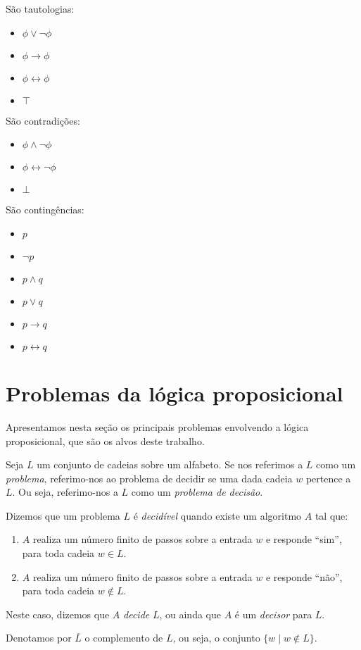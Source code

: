 \begin{example}
    São tautologias:
    \begin{itemize}
        \item $\phi \vee \neg \phi$
        \item $\phi \rightarrow \phi$
        \item $\phi \leftrightarrow \phi$
        \item $\top$
    \end{itemize}
    São contradições:
    \begin{itemize}
        \item $\phi \wedge \neg \phi$
        \item $\phi \leftrightarrow \neg \phi$
        \item $\bot$
    \end{itemize}
    São contingências:
    \begin{itemize}
    	\item $p$
    	\item $\neg p$
    	\item $p \wedge q$
    	\item $p \vee q$
    	\item $p \rightarrow q$
    	\item $p \leftrightarrow q$
    \end{itemize}
\end{example}

\section{Problemas da lógica proposicional}
\label{problemas_da_logica}

\indent

Apresentamos nesta seção os principais problemas envolvendo a lógica proposicional, que são os alvos deste trabalho.

\begin{definition}
	Seja $L$ um conjunto de cadeias sobre um alfabeto. Se nos referimos a $L$ como um \emph{problema}, referimo-nos ao problema de decidir se uma dada cadeia $w$ pertence a $L$. Ou seja, referimo-nos a $L$ como um \emph{problema de decisão}.
	
	Dizemos que um problema $L$ é \emph{decidível} quando existe um algoritmo $A$ tal que:
	\begin{enumerate}
		\item $A$ realiza um número finito de passos sobre a entrada $w$ e responde ``sim'', para toda cadeia $w \in L$.
		\item $A$ realiza um número finito de passos sobre a entrada $w$ e responde ``não'', para toda cadeia $w \notin L$.
	\end{enumerate}
	Neste caso, dizemos que $A$ \emph{decide} $L$, ou ainda que $A$ é um \emph{decisor} para $L$.
	
	Denotamos por $\overline{L}$ o complemento de $L$, ou seja, o conjunto $\{w \mid w \notin L \}$.
\end{definition}

